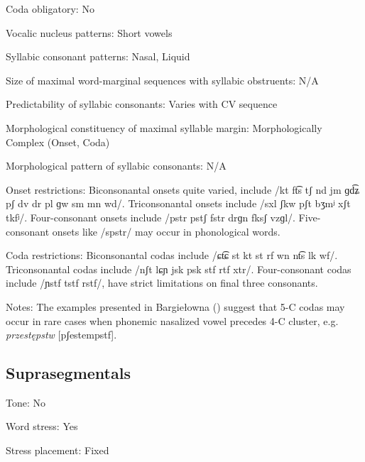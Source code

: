 {\begin{appendixdesc}
\item[Coda obligatory:] No

\item[Vocalic nucleus patterns:] Short vowels

\item[Syllabic consonant patterns:] Nasal, Liquid

\item[Size of maximal word-marginal sequences with syllabic obstruents:] N/A

\item[Predictability of syllabic consonants:] Varies with CV sequence

\item[Morphological constituency of maximal syllable margin:] Morphologically Complex (Onset, Coda)

\item[Morphological pattern of syllabic consonants:] N/A

\item[Onset restrictions:] Biconsonantal onsets quite varied, include /kt ft͡s tʃ nd jm ɡd͡ʑ pʃ dv dr pl ɡw sm mn wd/. Triconsonantal onsets include /sxl ʃkw pʃt bʒmʲ xʃt tkfʲ/. Four-consonant onsets include /pstr pstʃ fstr drɡn fksʃ vzɡl/. Five-consonant onsets like /spstr/ may occur in phonological words.

\item[Coda restrictions:] Biconsonantal codas include /ɕt͡ɕ st kt st rf wn nt͡s lk wf/. Triconsonantal codas include /nʃt lɕɲ jsk psk stf rtf xtr/. Four-consonant codas include /ɲstf tstf rstf/, have strict limitations on final three consonants.

\item[Notes:] The examples presented in Bargiełowna (\citeyear[21]{Bargiełowna1950}) suggest that 5-C codas may occur in rare cases when phonemic nasalized vowel precedes 4-C cluster, e.g. \textit{przestępstw} [pʃestempstf].
\end{appendixdesc}
\subsection*{Suprasegmentals}
\begin{appendixdesc}
\item[Tone:] No

\item[Word stress:] Yes

\item[Stress placement:] Fixed


\end{appendixdesc}}
